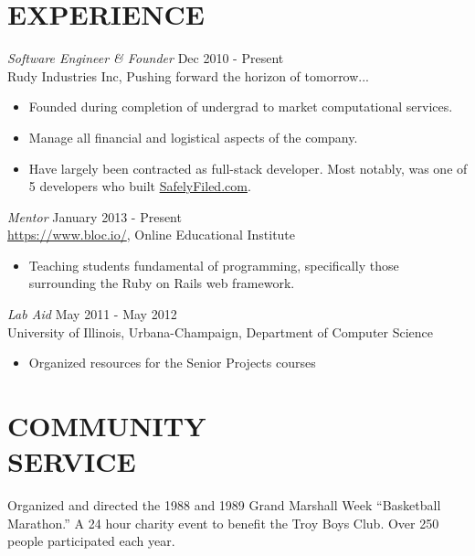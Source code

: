 \documentclass[margin]{res}
\begin{document}
\begin{resume}
    
 
\section{EXPERIENCE} 
  {\sl Software Engineer \& Founder} \hfill Dec 2010 - Present \\
  Rudy Industries Inc, Pushing forward the horizon of tomorrow...
  \begin{itemize}  
    \itemsep -2pt %
    \item Founded during completion of undergrad to market computational
      services.
    \item Manage all financial and logistical aspects of the company.
    \item Have largely been contracted as full-stack developer. Most notably, 
      was one of 5 developers who built 
      \href{https://safelyfiled.com/home/}{SafelyFiled.com}.
    \end{itemize}
 
  {\sl Mentor} \hfill January 2013 - Present \\
    \href{Bloc}{https://www.bloc.io/}, Online Educational Institute 
     \begin{itemize}  
     \item Teaching students fundamental of programming, specifically those
        surrounding the Ruby on Rails web framework.
     \end{itemize} 
  {\sl Lab Aid} \hfill May 2011 - May 2012 \\
    University of Illinois, Urbana-Champaign, Department of Computer Science
      \begin{itemize}
        \itemsep -2pt %
        \item Organized resources for the Senior Projects courses
      \end{itemize} 
 
\section{COMMUNITY \\ SERVICE}  Organized and directed the 1988 and 1989 Grand 
                 Marshall Week \newline ``Basketball Marathon.'' A 24 hour 
                charity event to benefit the Troy Boys Club. Over 
                250 people participated each year. 


\end{resume}
\end{document}
